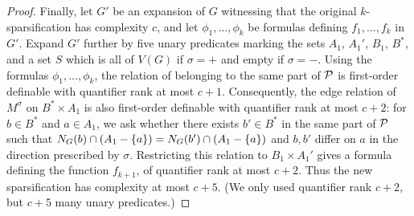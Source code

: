 \begin{proof}
Finally, let $G'$ be an expansion of $G$ witnessing that the original
$k$-sparsification has complexity $c$,
and let $\phi_1,\ldots,\phi_k$ be formulas defining
$f_1,\ldots,f_k$ in $G'$.
Expand $G'$ further by five unary predicates marking the sets
$A_1$, $A_1'$, $B_1$, $B^*$, and a set $S$ which is all of $V(G)$ if
$\sigma=+$ and empty if $\sigma=-$.
Using the formulas $\phi_1,\ldots,\phi_k$, the relation of belonging to the
same part of $\cal P$ is first-order definable with quantifier rank at most
$c+1$.
Consequently, the edge relation of $M^\sigma$ on $B^*\times A_1$ is also
first-order definable with quantifier rank at most $c+2$:
for $b\in B^*$ and $a\in A_1$, we ask whether there exists
$b'\in B^*$ in the same part of $\cal P$ such that
$N_G(b)\cap (A_1-\set{a})=N_G(b')\cap (A_1-\set{a})$ and
$b,b'$ differ on $a$ in the direction prescribed by $\sigma$.
Restricting this relation to $B_1\times A_1'$ gives a formula defining the
function $f_{k+1}$, of quantifier rank at most $c+2$.
Thus the new sparsification has complexity at most $c+5$.
(We only used quantifier rank $c + 2$, but $c+5$ many unary predicates.)
\end{proof}


